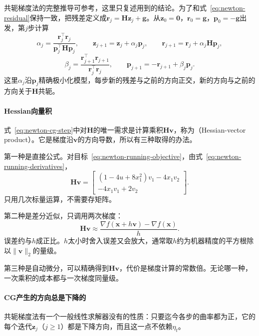 共轭梯度法的完整推导可参考，这里只复述用到的结论。为了和式~\eqref{eq:newton-residual}保持一致，把残差定义成$\bm{r}_j=\bm{H}\bm{z}_j+\bm{g}$。从$\bm{z}_0=\bm{0}$，$\bm{r}_0=\bm{g}$，$\bm{p}_0=-\bm{g}$出发，第$j$步计算
\begin{equation}
 \alpha_j=\frac{\bm{r}_j^\top\bm{r}_j}{\bm{p}_j^\top\bm{H}\bm{p}_j},\qquad
 \bm{z}_{j+1}=\bm{z}_j+\alpha_j\bm{p}_j,\qquad
 \bm{r}_{j+1}=\bm{r}_j+\alpha_j\bm{H}\bm{p}_j,
 \label{eq:newton-cg-step}
\end{equation}
\begin{equation}
 \beta_{j}=\frac{\bm{r}_{j+1}^\top\bm{r}_{j+1}}{\bm{r}_j^\top\bm{r}_j},\qquad
 \bm{p}_{j+1}=-\bm{r}_{j+1}+\beta_j\bm{p}_j.
 \label{eq:newton-cg-direction}
\end{equation}
这里$\alpha_j$沿$\bm{p}_j$精确极小化模型，每步新的残差与之前的方向正交，新的方向与之前的方向关于$\bm{H}$共轭。

\paragraph{Hessian向量积}
式~\eqref{eq:newton-cg-step}中对$\bm{H}$的唯一需求是计算乘积$\bm{H}\bm{v}$，称为（Hessian-vector product）。它是梯度沿$\bm{v}$的方向导数，所以有三种取得的办法。

第一种是直接公式。对目标~\eqref{eq:newton-running-objective}，由式~\eqref{eq:newton-running-derivatives}，
\[
 \bm{H}\bm{v}=\begin{bmatrix}(1-4u+8x_1^2)v_1-4x_1v_2\\-4x_1v_1+2v_2\end{bmatrix}.
\]
只用几次标量运算，不需要存矩阵。

第二种是差分近似，只调用两次梯度：
\begin{equation}
 \bm{H}\bm{v}\approx\frac{\nabla f(\bm{x}+h\bm{v})-\nabla f(\bm{x})}{h}.
 \label{eq:newton-hvp-difference}
\end{equation}
误差约与$h$成正比。$h$太小时舍入误差又会放大，通常取$h$约为机器精度的平方根除以$\lVert\bm{v}\rVert_2$的量级。

第三种是自动微分，可以精确得到$\bm{H}\bm{v}$，代价是梯度计算的常数倍。无论哪一种，一次乘积的成本都与一次梯度同量级。

\paragraph{CG产生的方向总是下降的}
共轭梯度法有一个一般线性求解器没有的性质：只要迄今各步的曲率都为正，它的每个迭代$\bm{z}_j$（$j\geq1$）都是下降方向，而且这一点不依赖$\eta_t$。

